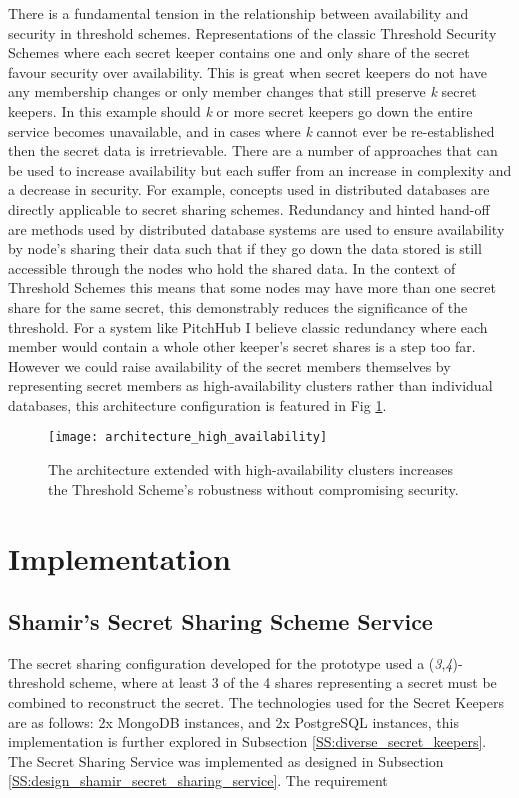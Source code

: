 There is a fundamental tension in the relationship between availability and security in threshold schemes. Representations of the classic Threshold Security Schemes where each secret keeper contains one and only share of the secret favour security over availability. This is great when secret keepers do not have any membership changes or only member changes that still preserve \textit{k} secret keepers. In this example should \textit{k} or more secret keepers go down the entire service becomes unavailable, and in cases where \textit{k} cannot ever be re-established then the secret data is irretrievable. There are a number of approaches that can be used to increase availability but each suffer from an increase in complexity and a decrease in security. For example, concepts used in distributed databases are directly applicable to secret sharing schemes. Redundancy and hinted hand-off are methods used by distributed database systems are used to ensure availability by node's sharing their data such that if they go down the data stored is still accessible through the nodes who hold the shared data. In the context of Threshold Schemes this means that some nodes may have more than one secret share for the same secret, this demonstrably reduces the significance of the threshold. For a system like PitchHub I believe classic redundancy where each member would contain a whole other keeper's secret shares is a step too far. However we could raise availability of the secret members themselves by representing secret members as high-availability clusters rather than individual databases, this architecture configuration is featured in Fig \ref{fig:architecture_high_availability}.

\begin{figure}[ht]
    \centering
    \texttt{[image: architecture\_high\_availability]}
    \caption{The architecture extended with high-availability clusters increases the Threshold Scheme's robustness without compromising security.}
    \label{fig:architecture_high_availability}
\end{figure}

\section{Implementation}

\subsection{Shamir's Secret Sharing Scheme Service}
The secret sharing configuration developed for the prototype used a (\textit{3},\textit{4})-threshold scheme, where at least 3 of the 4 shares representing a secret must be combined to reconstruct the secret. The technologies used for the Secret Keepers are as follows: 2x MongoDB instances, and 2x PostgreSQL instances, this implementation is further explored in Subsection \ref{SS:diverse_secret_keepers}. The Secret Sharing Service was implemented as designed in Subsection \ref{SS:design_shamir_secret_sharing_service}. The requirement

